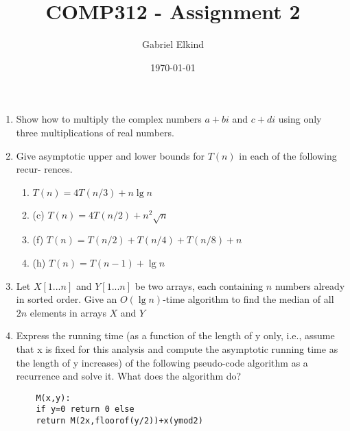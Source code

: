 \documentclass[a4paper,12pt]{article}
\author{Gabriel Elkind}
\title{COMP312 - Assignment 2}
\date{\today}
\begin{document}
\maketitle

\begin{enumerate}

\item Show how to multiply the complex numbers $a + bi$ and $c + di$ using only three
multiplications of real numbers.
    

\item Give asymptotic upper and lower bounds for $T(n)$ in each of the following recur-
rences.
\begin{enumerate}
    \item $T(n)=4T(n/3)+n \lg n$
    \item(c) $T(n)=4T(n/2)+n^2\sqrt{n}$
    \item(f) $T(n)=T(n/2)+T(n/4)+T(n/8)+n$
    \item(h) $T(n)=T(n-1)+\lg n$ 
\end{enumerate}

\item Let $X[1...n]$ and $Y[1...n]$ be two arrays, each containing $n$ numbers already in sorted order. Give an $O(\lg n)$-time algorithm to find the median of all $2n$ elements in arrays $X$ and $Y$ 

\item Express the running time (as a function of the length of y only, i.e., assume that x is fixed for this analysis and compute the asymptotic running time as the length of y increases) of the following pseudo-code algorithm as a recurrence and solve it. What does the algorithm do?

\begin{verbatim}
    M(x,y):
    if y=0 return 0 else
    return M(2x,floorof(y/2))+x(ymod2)
\end{verbatim}


\end{enumerate}
\end{document}
